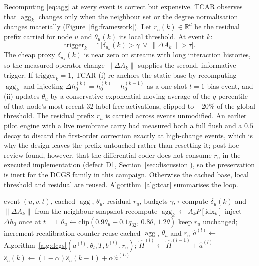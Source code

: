 \documentclass[preprint,12pt]{elsarticle}
\begin{document}
Recomputing \eqref{eq:agg} at every event is correct but expensive. TCAR observes that $\operatorname{agg}_k$ changes only when the neighbour set or the degree normalisation changes materially (Figure~\ref{fig:framework}). Let $r_u(k)\in\mathbb R^d$ be the residual prefix carried for node $u$ and $\theta_u(k)$ its local threshold. At event $k$:
\begin{equation}
\text{trigger}_k=\mathbb 1\big[\delta_{u_k}(k)>\gamma\ \vee\ \|\Delta A_k\|>\tau\big].
\label{eq:gate}
\end{equation}
The cheap proxy $\delta_{u_k}(k)$ is near zero on streams with long interaction histories, so the measured operator change $\|\Delta A_k\|$ supplies the second, informative trigger. If $\text{trigger}_k=1$, TCAR (i) re-anchors the static base by recomputing $\operatorname{agg}_k$ and injecting $\Delta h_0^{(k)}=h_0^{(k)}-h_0^{(k-1)}$ as a one-shot $t{=}1$ bias event, and (ii) updates $\theta_u$ by a conservative exponential moving average of the $q$-percentile of that node's most recent 32 label-free activations, clipped to $\pm20\%$ of the global threshold. The residual prefix $r_u$ is carried across events unmodified. An earlier pilot engine with a live membrane carry had measured both a full flush and a $0.5$ decay to discard the first-order correction exactly at high-change events, which is why the design leaves the prefix untouched rather than resetting it; post-hoc review found, however, that the differential coder does not consume $r_u$ in the executed implementation (defect D1, Section~\ref{sec:discussion}), so the preservation is inert for the DCGS family in this campaign. Otherwise the cached base, local threshold and residual are reused. Algorithm~\ref{alg:tcar} summarises the loop.

\begin{algorithm}[t]
\caption{TCAR event loop for one node}
\label{alg:tcar}
\begin{algorithmic}[1]
\Require event $(u,v,t)$, cached $\operatorname{agg}$, $\theta_u$, residual $r_u$, budgets $\gamma, \tau$
\State compute $\delta_u(k)$ and $\|\Delta A_k\|$ from the neighbour snapshot
  \State recompute $\operatorname{agg}_k\leftarrow A_k P[\mathrm{idx}_k]$
  \State inject $\Delta h_0$ once at $t{=}1$
  \State $\theta_u\leftarrow \mathrm{clip}(0.9\theta_u+0.1 q_{32},\,0.8\theta,\,1.2\theta)$
  \State keep $r_u$ unchanged; \quad increment recalibration counter
\Else
  \State reuse cached $\operatorname{agg}$, $\theta_u$ and $r_u$
\EndIf
{}
  \State $\hat a^{(l)}\leftarrow$ Algorithm~\ref{alg:dcgs}$(a^{(l)},\theta_l,T,b^{(l)},r_u)$; \quad $\hat H^{(l)}\leftarrow\hat H^{(l-1)}+\hat a^{(l)}$
\EndFor
\State $\hat s_u(k)\leftarrow(1-\alpha)\hat s_u(k-1)+\alpha\,\hat a^{(L)}$
\end{algorithmic}
\end{algorithm}
\end{document}
